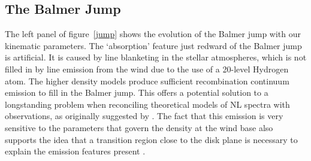 \documentclass[preprint, a4paper, 11pt]{aastex}
\begin{document}
{\subsection{The Balmer Jump}

\label{balmerjump}

The left panel of figure~\ref{jump} shows the evolution
of the Balmer jump with our kinematic parameters. 
The `absorption' feature just redward of the Balmer jump
is artificial. It is caused by line blanketing in the stellar atmospheres,
which is not filled in by line emission from the wind
due to the use of a 20-level Hydrogen atom.
The higher density models
produce sufficient recombination continuum emission to fill 
in the Balmer jump. This offers a potential solution to a 
longstanding problem when reconciling theoretical
models of NL spectra with observations, as originally suggested by
\cite{KLWB98}. The fact that this emission is very sensitive to the parameters
that govern the density at the wind base also supports
the idea that a transition region close to the disk plane is necessary
to explain the emission features present \citep{kd1997}.



}
\end{document}

